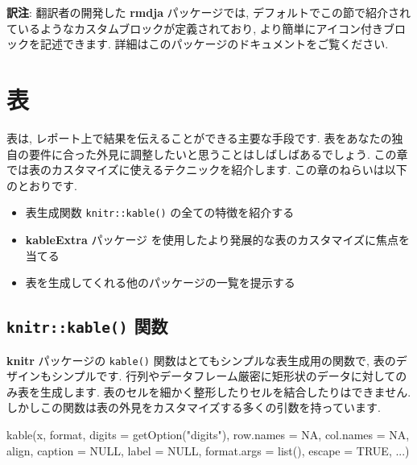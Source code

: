 \documentclass[
  11pt,
]{bxjsreport}
\newenvironment{Shaded}{\begin{snugshade}}{\end{snugshade}}
\newcommand{\AttributeTok}[1]{\textcolor[rgb]{0.77,0.63,0.00}{#1}}
\newcommand{\ConstantTok}[1]{\textcolor[rgb]{0.00,0.00,0.00}{#1}}
\newcommand{\FunctionTok}[1]{\textcolor[rgb]{0.00,0.00,0.00}{#1}}
\newcommand{\NormalTok}[1]{#1}
\newcommand{\StringTok}[1]{\textcolor[rgb]{0.31,0.60,0.02}{#1}}
\providecommand{\tightlist}{%
  \setlength{\itemsep}{0pt}\setlength{\parskip}{0pt}}
\begin{document}
\textbf{訳注}: 翻訳者の開発した \textbf{rmdja} パッケージでは, デフォルトでこの節で紹介されているようなカスタムブロックが定義されており, より簡単にアイコン付きブロックを記述できます. 詳細はこのパッケージのドキュメントをご覧ください.

\hypertarget{tables}{%
\chapter{表}\label{tables}}

表は, レポート上で結果を伝えることができる主要な手段です. 表をあなたの独自の要件に合った外見に調整したいと思うことはしばしばあるでしょう. この章では表のカスタマイズに使えるテクニックを紹介します. この章のねらいは以下のとおりです.

\begin{itemize}
\tightlist
\item
  表生成関数 \texttt{knitr::kable()} の全ての特徴を紹介する
\item
  \textbf{kableExtra} パッケージ \autocite{R-kableExtra} を使用したより発展的な表のカスタマイズに焦点を当てる
\item
  表を生成してくれる他のパッケージの一覧を提示する
\end{itemize}

\hypertarget{kable}{%
\section{\texorpdfstring{\texttt{knitr::kable()} 関数}{knitr::kable() 関数}}\label{kable}}

\textbf{knitr} パッケージの \texttt{kable()} 関数はとてもシンプルな表生成用の関数で, 表のデザインもシンプルです. 行列やデータフレーム厳密に矩形状のデータに対してのみ表を生成します. 表のセルを細かく整形したりセルを結合したりはできません. しかしこの関数は表の外見をカスタマイズする多くの引数を持っています.

\begin{Shaded}
\begin{Highlighting}[numbers=left,,]
\FunctionTok{kable}\NormalTok{(x, format, }\AttributeTok{digits =} \FunctionTok{getOption}\NormalTok{(}\StringTok{"digits"}\NormalTok{), }\AttributeTok{row.names =} \ConstantTok{NA}\NormalTok{, }
  \AttributeTok{col.names =} \ConstantTok{NA}\NormalTok{, align, }\AttributeTok{caption =} \ConstantTok{NULL}\NormalTok{, }\AttributeTok{label =} \ConstantTok{NULL}\NormalTok{, }
  \AttributeTok{format.args =} \FunctionTok{list}\NormalTok{(), }\AttributeTok{escape =} \ConstantTok{TRUE}\NormalTok{, ...)}
\end{Highlighting}
\end{Shaded}
\end{document}
